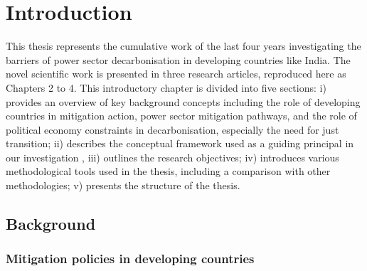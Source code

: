 \documentclass[../thesis.tex]{subfiles}
\begin{document}
\chapter{Introduction}\label{ch:intro}
This thesis represents the cumulative work of the last four years investigating the barriers of power sector decarbonisation in developing countries like India. The novel scientific work is presented in three research articles, reproduced here as Chapters 2 to 4. This introductory chapter is divided into five sections: i) provides an overview of key background concepts including the role of developing countries in mitigation action, power sector mitigation pathways, and the role of political economy constraints in decarbonisation, especially the need for just transition; ii) describes the conceptual framework used as a guiding principal in our investigation , iii) outlines the research objectives; iv) introduces various methodological tools used in the thesis, including a comparison with other methodologies; v) presents the structure of the thesis.

\section{Background}
\subsection{Mitigation policies in developing countries}\label{subsec:mit_developing}
 
\end{document}
